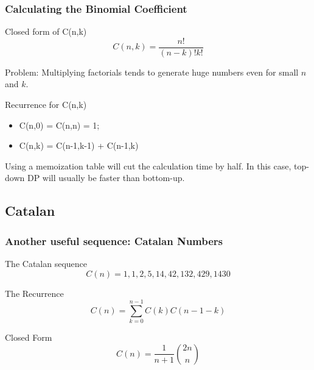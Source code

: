 \documentclass{beamer}
\begin{document}
\begin{frame}
  \frametitle{Calculating the Binomial Coefficient}
  {\smaller

    \begin{block}{Closed form of C(n,k)}
      \begin{equation*}
        C(n,k) = \frac{n!}{(n-k)!k!}
      \end{equation*}

      \alert{Problem}: Multiplying factorials tends to generate huge numbers
      even for small $n$ and $k$.
    \end{block}

    \begin{block}{Recurrence for C(n,k)}
      \begin{itemize}
      \item C(n,0) = C(n,n) = 1;
      \item C(n,k) = C(n-1,k-1) + C(n-1,k)
      \end{itemize}

      Using a memoization table will cut the calculation time by
      half. In this case, top-down DP will usually be faster than
      bottom-up.
    \end{block}
  }
\end{frame}

\subsection{Catalan}

\begin{frame}
  \frametitle{Another useful sequence: Catalan Numbers}
  {\smaller
  \begin{block}{The Catalan sequence}
    \begin{equation*}
      C(n) = 1, 1, 2, 5, 14, 42, 132, 429, 1430
    \end{equation*}
  \end{block}

  \begin{exampleblock}{The Recurrence}
    \begin{equation*}
    C(n) = \sum^{n-1}_{k=0}C(k)C(n-1-k)
    \end{equation*}
  \end{exampleblock}

  \begin{exampleblock}{Closed Form}
    \begin{equation*}
      C(n) = \frac{1}{n+1}\binom{2n}{n}
    \end{equation*}
  \end{exampleblock}
  }
\end{frame}
\end{document}
